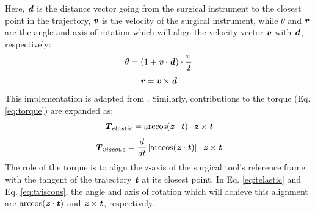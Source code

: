 \documentclass[../main.tex]{subfiles}
\begin{document}
Here, $\textbf{\textit{d}}$ is the distance vector going from the surgical instrument to the closest point in the trajectory, $\textbf{\textit{v}}$ is the velocity of the surgical instrument, while $\theta$ and $\textbf{\textit{r}}$ are the angle and axis of rotation which will align the velocity vector $\textbf{\textit{v}}$ with $\textbf{\textit{d}}$, respectively:
\begin{equation}
    \theta = (1+\textbf{\textit{v}}\cdot\textbf{\textit{d}})\cdot\frac{\pi}{2}
\end{equation}
\begin{equation}
    \textbf{\textit{r}} = \textbf{\textit{v}}\times\textbf{\textit{d}}
\end{equation}
This implementation is adapted from \cite{Enayati2016}. Similarly, contributions to the torque (Eq. \ref{eq:torque}) are expanded as: 
\begin{equation}
    \textbf{\textit{T}}_{elastic} = \arccos (\textbf{\textit{z}}\cdot\textbf{\textit{t}} ) \cdot \textbf{\textit{z}} \times \textbf{\textit{t}}
    \label{eq:telastic}
\end{equation}
\begin{equation}
    \textbf{\textit{T}}_{viscous} = \frac{d}{dt} \left[ \arccos (\textbf{\textit{z}}\cdot\textbf{\textit{t}} ) \right] \cdot \textbf{\textit{z}} \times \textbf{\textit{t}}
    \label{eq:tviscous}
\end{equation}
The role of the torque is to align the z-axis of the surgical tool's reference frame with the tangent of the trajectory $\textbf{\textit{t}}$ at its closest point. In Eq. \ref{eq:telastic} and Eq. \ref{eq:tviscous}, the angle and axis of rotation which will achieve this alignment are $\arccos(\textbf{\textit{z}}\cdot\textbf{\textit{t}})$ and $\textbf{\textit{z}} \times \textbf{\textit{t}}$, respectively.
\end{document}
